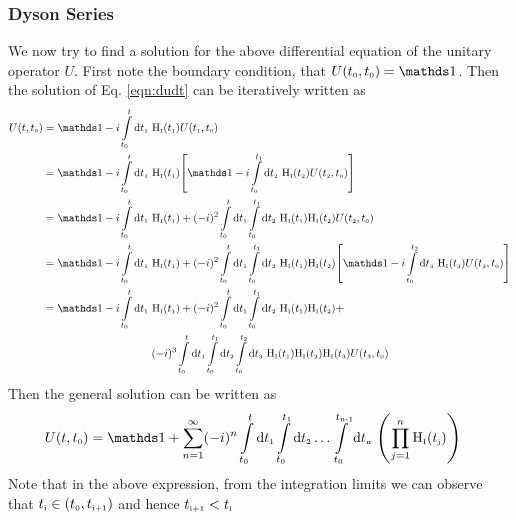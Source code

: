 \subsubsection{Dyson Series}
We now try to find a solution for the above differential equation of the unitary operator $U$. First note the boundary condition, that $U(t\tund{0},t\tund{0})= \iden $. Then the solution of Eq. \ref{eqn:dudt} can be iteratively written as
\begin{align*}
    U(t,t\tund{0}) &= \iden - i \int\limits_{t\tund{0}}^t \dd t\tund{1}\ \hint(\ti) U(\ti, \tz)\\
    &=\iden - i \int\limits_{t\tund{0}}^t \dd t\tund{1}\ \hint(\ti) \qty[ \iden - i \int\limits_{\tz}^{\ti} \dd \tii\ \hint(\tii) U(\tii, \tz)]\\
    &=\iden - i \int\limits_{\tz}^t \dd \ti \ \hint(\ti) + (-i)^2 \int\limits_{\tz}^t \dd \ti \int\limits_{\tz}^{\ti} \dd \tii\ \hint(\ti)\hint(\tii) U(\tii, \tz)\\
    &=\iden - i \int\limits_{\tz}^t \dd \ti \ \hint(\ti) + (-i)^2 \int\limits_{\tz}^t \dd \ti \int\limits_{\tz}^{\ti} \dd \tii\ \hint(\ti)\hint(\tii) \qty[\iden - i \int\limits_{t\tund{0}}^\tii \dd \tiii\ \hint(\tiii) U(\tiii, \tz)]\\
    &=\iden - i \int\limits_{\tz}^t \dd \ti \ \hint(\ti) + (-i)^2 \int\limits_{\tz}^t \dd \ti \int\limits_{\tz}^{\ti} \dd \tii\ \hint(\ti)\hint(\tii) + \\ &\qquad\qquad\qquad\qquad\qquad(-i)^3 \int\limits_{\tz}^t \dd \ti \int\limits_{\tz}^{\ti} \dd \tii \int\limits_{\tz}^\tii \dd \tiii \ \hint(\ti)\hint(\tii)\hint(\tiii) U(\tiii, \tz)
\end{align*}
Then the general solution can be written as 
\begin{align*}
     U(t,t\tund{0}) &= \iden + \sum \limits_{n=1}^\infty (-i)^n \int\limits_{\tz}^{t}\dd \ti \int\limits_{\tz}^{\ti}\dd \tii \ldots \int\limits_{\tz}^{t\tund{n-1}}\dd t\tund{n}\ \qty( \prod\limits_{j=1}^{n} \hint(t\tund{j}))
\end{align*}
Note that in the above expression, from the integration limits we can observe that $t_{\text{\tiny i}} \in ({t_{\text{\tiny 0}}}, t_{\text{\tiny i+1}})$ and hence $t_{\text{\tiny i+1}}<t_{\text{\tiny i}}$ 
